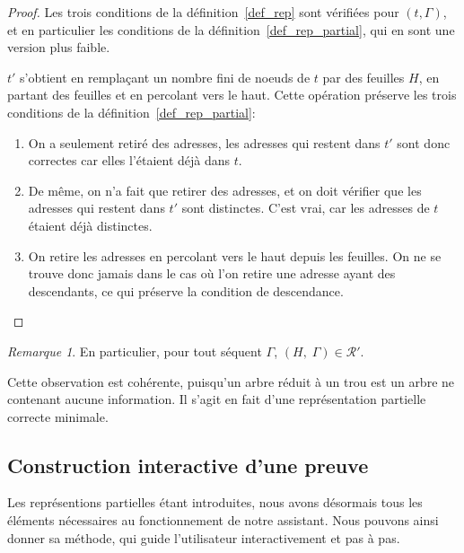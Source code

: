\documentclass[11pt,a4paper]{article}
\theoremstyle{plain}
\theoremstyle{definition}
\theoremstyle{remark}
\newtheorem{remark}{Remarque}
\newcommand*{\sequent}{\Gamma}
\newcommand*{\representationspartial}{\ensuremath{\mathcal{R'}}}
\newcommand*{\unknown}{H}
\newcommand*{\caddpartial}{(a)}
\newcommand*{\clinpartial}{(b')}
\newcommand*{\cdespartial}{(c)}
\begin{document}
\begin{proof}
    Les trois conditions de la définition~\ref{def_rep} sont vérifiées pour $(t, \sequent)$, et en particulier les conditions de la définition~\ref{def_rep_partial}, qui en sont une version plus faible. 
    
    $t'$ s'obtient en remplaçant un nombre fini de noeuds de $t$ par des feuilles $\unknown$, en partant des feuilles et en percolant vers le haut. Cette opération préserve les trois conditions de la définition~\ref{def_rep_partial}:

    \begin{enumerate}
        \item[\caddpartial] On a seulement retiré des adresses, les adresses qui restent dans $t'$ sont donc correctes car elles l'étaient déjà dans $t$.

        \item[\clinpartial] De même, on n'a fait que retirer des adresses, et on doit vérifier que les adresses qui restent dans $t'$ sont distinctes. C'est vrai, car les adresses de $t$ étaient déjà distinctes.

        \item[\cdespartial] On retire les adresses en percolant vers le haut depuis les feuilles. On ne se trouve donc jamais dans le cas où l'on retire une adresse ayant des descendants, ce qui préserve la condition de descendance.
\qedhere
    \end{enumerate}
\end{proof}

\begin{remark}
    En particulier, pour tout séquent $\sequent$, $(\unknown, \; \sequent) \in \representationspartial$. 
    
    Cette observation est cohérente, puisqu'un arbre réduit à un trou est un arbre ne contenant aucune information. Il s'agit en fait d'une représentation partielle correcte minimale.
\end{remark}

\subsection{Construction interactive d'une preuve}

Les représentions partielles étant introduites, nous avons désormais tous les éléments nécessaires au fonctionnement de notre assistant. Nous pouvons ainsi donner sa méthode, qui guide l'utilisateur interactivement et pas à pas.
\end{document}
